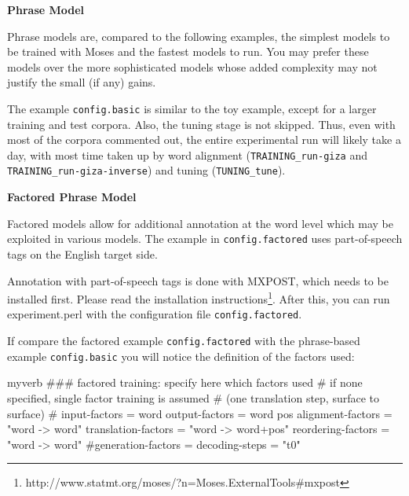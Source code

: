 \vspace{2mm}

{\bf 
\label{experiment-perl.texntoc5}Phrase Model}


Phrase models are, compared to the following examples, the simplest models to be trained with Moses and the fastest models to run. You may prefer these models over the more sophisticated models whose added complexity may not justify the small (if any) gains.



The example {\tt config.basic} is similar to the toy example, except for a larger training and test corpora. Also, the tuning stage is not skipped. Thus, even with most of the corpora commented out, the entire experimental run will likely take a day, with most time taken up by word alignment ({\tt TRAINING\_run-giza} and {\tt TRAINING\_run-giza-inverse}) and tuning ({\tt TUNING\_tune}).



\vspace{2mm}

{\bf 
\label{experiment-perl.texntoc6}Factored Phrase Model}


Factored models allow for additional annotation at the word level which may be exploited in various models. The example in {\tt config.factored} uses part-of-speech tags on the English target side. 



Annotation with part-of-speech tags is done with MXPOST, which needs to be installed first. Please read the installation instructions\footnote{\sf http://www.statmt.org/moses/?n=Moses.ExternalTools\#mxpost}. After this, you can run experiment.perl with the configuration file {\tt config.factored}.



If compare the factored example {\tt config.factored} with the phrase-based example {\tt config.basic} you will notice the definition of the factors used:






\begin{SaveVerbatim}{myverb}
 ### factored training: specify here which factors used
 # if none specified, single factor training is assumed
 # (one translation step, surface to surface)
 #
 input-factors = word
 output-factors = word pos
 alignment-factors = "word -> word"
 translation-factors = "word -> word+pos"
 reordering-factors = "word -> word"
 #generation-factors = 
 decoding-steps = "t0"
\end{SaveVerbatim}
\colorbox{gray}{%
}

